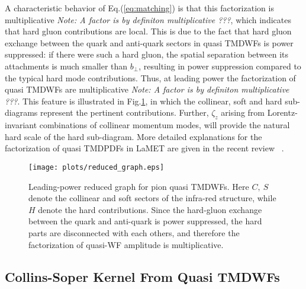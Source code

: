 \documentclass[prd,aps,twocolumn,preprintnumbers, showpacs, nofootinbib,superscriptaddress,notitlepage]{revtex4-1}
\newcommand{\red}[1]{\textcolor{red}{#1}} %
\newcommand\bl{\color{blue}}
\begin{document}

A characteristic behavior of Eq.(\ref{eq:matching}) is that this factorization is multiplicative {\bl \em Note: A factor is by definiton multiplicative ???}, which indicates {\bl that} hard gluon contributions are local. This is due to the fact that hard gluon exchange between  the quark and anti-quark  sectors in quasi TMDWFs {\bl is} power suppressed: if there were such a hard gluon, the spatial separation between its attachments  is much smaller than $b_{\perp}$, resulting {\bl in} power suppression compared to the typical hard mode contributions.  
Thus, at leading power the factorization of quasi TMDWFs  are multiplicative  {\bl \em Note: A factor is by definiton multiplicative ???}.  This feature  is illustrated in Fig.\ref{fig:reduced_graph}, in which the collinear, soft and hard sub-diagrams represent the pertinent  contributions. Further, $\zeta_z$ arising from   Lorentz-invariant combinations of collinear {\bl momentum modes}, will provide the natural hard scale of the hard sub-diagram. More detailed explanations for the factorization of quasi TMDPDFs in LaMET are given in the recent review~ \cite{Ji:2019ewn}. 


\begin{figure}
\centering
\texttt{[image: plots/reduced\_graph.eps]}
\caption{Leading-power reduced graph for pion quasi TMDWFs. Here $C, ~S$ denote the collinear and soft sectors of the infra-red structure, while $H$ denote the hard contributions. Since the hard-gluon exchange between the quark and anti-quark is power suppressed, the hard parts are disconnected with each others, and therefore the factorization of quasi-WF amplitude is multiplicative.  }
\label{fig:reduced_graph}
\end{figure}




\subsection{Collins-Soper Kernel From Quasi TMDWFs}\label{sec:extractingCSkernel}
\end{document}
